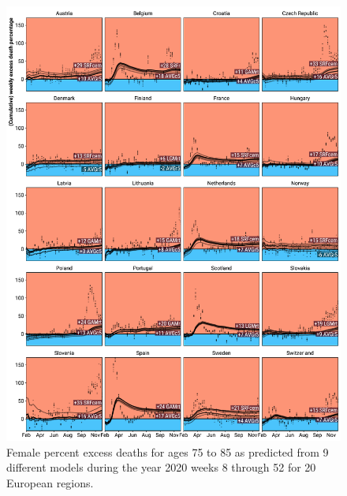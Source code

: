 \documentclass[12pt]{article}
\begin{document}
\begin{appendix}
\begin{figure}
\caption{
Female percent excess deaths for ages 75 to 85 as predicted from 9 different models during the year 2020 weeks 8 through 52 for 20 European regions.}
\label{fig:excessf75to85}
\includegraphics{excess_female__75_85_.pdf}
\end{figure}


\end{appendix}
\end{document}
